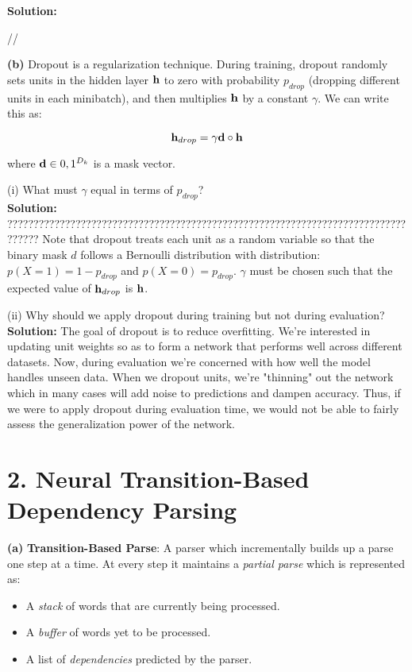 \documentclass[10pt]{article}
\begin{document}
\textbf{Solution:}

//

\textbf{(b)} Dropout is a regularization technique. During training, dropout randomly sets units in the hidden layer \(\bold{h}\) to
 zero with probability \(p_{drop}\) (dropping different units in each minibatch), and then multiplies \(\bold{h}\) by a constant
 \(\gamma\). We can write this as:

\[\bold{h}_{drop} = \gamma \bold{d} \circ \bold{h}\]

where \(\bold{d} \in {0, 1}^{D_k}\) is a mask vector.

(i) What must \(\gamma\) equal in terms of \(p_{drop}\)?\\

\textbf{Solution:}
??????????????????????????????????????????????????????????????????????????????????
Note that dropout treats each unit as a random variable so that the binary mask \(d\) follows a Bernoulli distribution
with distribution: \(p(X=1) = 1 - p_{drop}\) and \(p(X=0) = p_{drop}\). \(\gamma\) must be chosen such that the expected value
of \(\bold{h}_{drop}\) is \(\bold{h}\). 

(ii) Why should we apply dropout during training but not during evaluation?\\

\textbf{Solution:}
The goal of dropout is to reduce overfitting. We're interested in updating unit weights so as to form a network that
performs well across different datasets. Now, during evaluation we're concerned with how well the model handles unseen
data. When we dropout units, we're "thinning" out the network which in many cases will add noise to predictions and 
dampen accuracy. Thus, if we were to apply dropout during evaluation time, we would not be able to fairly assess the
generalization power of the network.

\newpage

\section*{2. Neural Transition-Based Dependency Parsing}
\label{sec:org083d954}

\textbf{(a)} \textbf{Transition-Based Parse}: A parser which incrementally builds up a parse one step at a time. At every step it 
maintains a \emph{partial parse} which is represented as:

\begin{itemize}
\item A \emph{stack} of words that are currently being processed.
\item A \emph{buffer} of words yet to be processed.
\item A list of \emph{dependencies} predicted by the parser.
\end{itemize}
\end{document}
